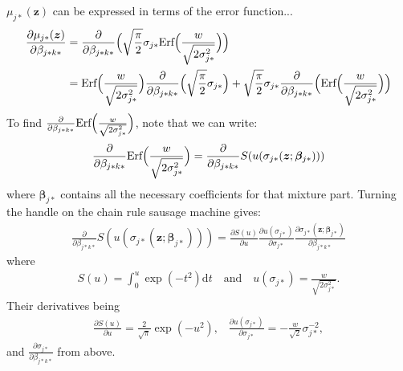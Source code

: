 $\mu_{j*}(\bm{z})$ can be expressed in terms of the error function...
\begin{align*}
\frac{\partial \mu_{j*}(\bm{z})}{\partial \beta_{j*k*}} &=\frac{\partial}{\partial \beta_{j*k*}} \Big( \sqrt{\frac{\pi}{2}} \sigma_{j*} \text{Erf}\Big(\frac{w}{\sqrt{2\sigma_{j*}^2}}\Big) \Big)\\
&= \text{Erf}\Big(\frac{w}{\sqrt{2\sigma_{j*}^2}}\Big) \frac{\partial}{\partial \beta_{j*k*}} \Big( \sqrt{\frac{\pi}{2}} \sigma_{j*} \Big) + \sqrt{\frac{\pi}{2}} \sigma_{j*} \frac{\partial}{\partial \beta_{j*k*}} \Big(\text{Erf}\Big(\frac{w}{\sqrt{2\sigma_{j*}^2}}\Big) \Big)
\end{align*}
To find $\frac{\partial}{\partial \beta_{j*k*}} \text{Erf}\Big(\frac{w}{\sqrt{2\sigma_{j*}^2}}\Big)$, note that we can write:
\begin{align*}
\frac{\partial}{\partial \beta_{j*k*}} \text{Erf}\Big(\frac{w}{\sqrt{2\sigma_{j*}^2}}\Big) = \frac{\partial}{\partial \beta_{j*k*}} S(u(\sigma_{j*}(\bm{z};\bm{\beta}_{j*})))
\end{align*}
where $\bm{\beta}_{j*}$ contains all the necessary coefficients for that mixture part. Turning the handle on the chain rule sausage machine gives:
\begin{align*}
\frac{\partial}{\partial \beta_{j*k*}} S(u(\sigma_{j*}(\bm{z};\bm{\beta}_{j*}))) = \frac{\partial S(u)}{\partial u} \frac{\partial u(\sigma_{j*})}{\partial \sigma_{j*} } \frac{\partial \sigma_{j*}(\bm{z};\bm{\beta}_{j*})}{\partial \beta_{j*k*}}
\end{align*}
where 
\begin{align*}
S(u) = \int_0^{u} \exp(-t^2) \text{d}t \quad \text{and} \quad u(\sigma_{j*})=\frac{w}{\sqrt{2\sigma_{j*}^2}}.
\end{align*}
Their derivatives being
\begin{align*}
\frac{\partial S(u)}{\partial u} = \frac{2}{\sqrt{\pi}} \exp(-u^2) \text{,} \quad \frac{\partial u(\sigma_{j*})}{\partial \sigma_{j*}} = -\frac{w}{\sqrt{2}}\sigma_{j*}^{-2},
\end{align*}
and $\frac{\partial \sigma_{j*}}{\partial \beta_{j*k*}}$ from above.

